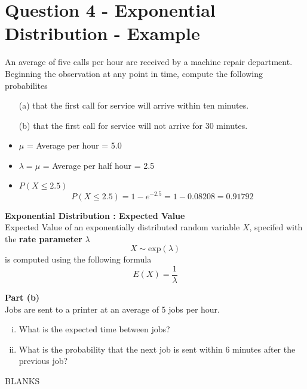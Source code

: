 \documentclass[a4paper,12pt]{article}
\begin{document}
\large 

\section*{Question 4 - Exponential Distribution - Example}

An average of five calls per hour are received by a machine repair department. 
Beginning the observation at any point in time, compute the following probabilites

\begin{itemize} 
\item[(a)] that the first call 
for service will arrive within ten minutes.
\item[(b)] that the first call 
for service will not arrive for 30 minutes.
\end{itemize}

\begin{itemize}
\item $\mu$ = Average per hour = 5.0
\item $\lambda= \mu$ = Average per half hour = 2.5
\item $P(X \leq 2.5) $
\[P(X \leq 2.5) = 1 - e^{-2.5} = 1 - 0.08208 = 0.91792\]
\end{itemize}

\begin{framed}
\large 
\noindent \textbf{Exponential Distribution : Expected Value}\\
\smallskip
\noindent Expected Value of an exponentially distributed random variable $X$, specifed with the \textbf{rate parameter} $\lambda$
\[ X \sim \mbox{exp}(\lambda)  \]
is computed using the following formula
\[ E(X) = \frac{1}{\lambda} \]

\end{framed}
\newpage 
\noindent \textbf{Part (b)}\\
\noindent
Jobs are sent to a printer at an average of 5 jobs per hour. 
\begin{enumerate}[(i)]
\item  What is the expected time between jobs? 
\item  What is the probability that the next job is sent within 6 minutes after the previous job?
\end{enumerate}
\bigskip 
\newpage 
BLANKS
\end{document}
